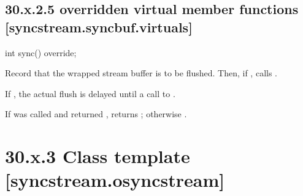 \documentclass[ebook,11pt,article]{memoir}
\begin{document}
\subsection{30.x.2.5  overridden virtual member functions [syncstream.syncbuf.virtuals]}


\begin{addedblock}
\begin{itemdecl}
int sync() override;
\end{itemdecl}
\begin{itemdescr}
\pnum
\effects 
Record that the wrapped stream buffer is to be flushed. 
Then, if , calls .
\begin{note}
If , the actual flush is delayed until a call to .
\end{note}

\pnum
\returns
If  was called and returned , returns ; otherwise .
\end{itemdescr}

\end{addedblock}

\section{30.x.3 Class template  [syncstream.osyncstream] }

\end{document}
